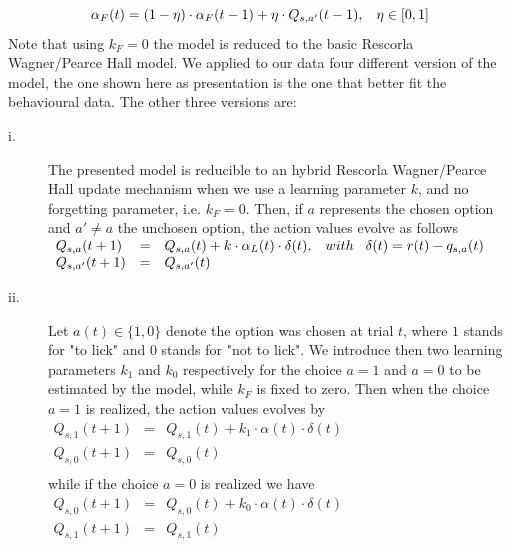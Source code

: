 \begin{equation}
    \alpha_F(t)=(1-\eta)\cdot\alpha_F(t-1)+\eta\cdot Q_{s,a'}(t-1), \hspace{0.3cm}
    \eta\in[0,1]
    \label{eq:Alphaforgetting}
\end{equation}
Note that using $k_F = 0$ the model is reduced to the basic Rescorla Wagner/Pearce Hall model. We applied to our data four different version of the model, the one shown here as presentation is the one that better fit the behavioural data. The other three versions are:
\begin{description}
    \item[i.] The presented model is reducible to an hybrid Rescorla Wagner/Pearce Hall update mechanism when we use a learning parameter $k$, and no forgetting parameter, i.e. $k_F = 0$.
    Then, if $a$ represents the chosen option and $a'\neq a$ the unchosen option, the action values evolve as follows\\
    $\begin{array}{lcl}
    Q_{s,a}(t+1)&=& Q_{s,a}(t)+k\cdot\alpha_L(t)\cdot\delta(t), \hspace{0.3cm} with \hspace{0.3cm}\delta(t)=r(t)-q_{s,a}(t)\\
    Q_{s,a'}(t+1)&=&Q_{s,a'}(t)\\
    \end{array}$
    \item[ii.] Let $a(t) \in \{1,0\}$ denote the option was chosen at trial $t$, where $1$ stands for "to lick" and $0$ stands for "not to lick". We introduce then two learning parameters $k_{1}$ and $k_{0}$ respectively for the choice $a=1$ and $a=0$ to be estimated by the model, while $k_F$ is fixed to zero.
    Then when the choice $a=1$ is realized, the action values evolves by\\
   $\begin{array}{lcl}
       Q_{s,1}(t+1)&=&Q_{s,1}(t)+k_1\cdot\alpha(t)\cdot\delta(t)\\
         Q_{s,0}(t+1)&=&Q_{s,0}(t)\\ 
    \end{array}$\\
    while if the choice $a=0$ is realized we have\\
    $\begin{array}{lcl}
       Q_{s,0}(t+1)&=&Q_{s,0}(t)+k_0\cdot\alpha(t)\cdot\delta(t)\\
         Q_{s,1}(t+1)&=&Q_{s,1}(t)\\ 
    \end{array}$

\end{description}
